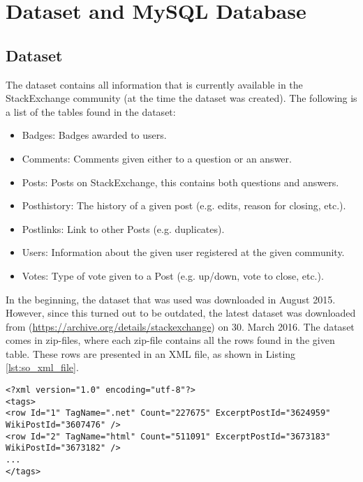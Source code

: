 \label{chap:chapter3}

\section{Dataset and MySQL Database}
\label{sec:dataset_db}

\subsection{Dataset}
The dataset contains all information that is currently available in the StackExchange community 
(at the time the dataset was created). The following is a list of the tables found in the dataset:
\begin{itemize}
	\item Badges: Badges awarded to users.
	\item Comments: Comments given either to a question or an answer.
	\item Posts: Posts on StackExchange, this contains both questions and answers.
	\item Posthistory: The history of a given post (e.g. edits, reason for closing, etc.).
	\item Postlinks: Link to other Posts (e.g. duplicates).
	\item Users: Information about the given user registered at the given community.
	\item Votes: Type of vote given to a Post (e.g. up/down, vote to close, etc.).
\end{itemize}
In the beginning, the dataset that was used was downloaded in August 2015. However, since this turned out 
to be outdated, the latest dataset was downloaded from (\url{https://archive.org/details/stackexchange}) on 
30. March 2016. The dataset comes in zip-files, where each zip-file contains all the rows found in the given 
 table. These rows are presented in an XML file, as shown in Listing \ref{lst:so_xml_file}.
\begin{lstlisting}[caption={Content in stackoverflow.com-Tags.xml}, label={lst:so_xml_file}] 
<?xml version="1.0" encoding="utf-8"?>
<tags>
<row Id="1" TagName=".net" Count="227675" ExcerptPostId="3624959" 
WikiPostId="3607476" />
<row Id="2" TagName="html" Count="511091" ExcerptPostId="3673183" 
WikiPostId="3673182" />
...
</tags>
\end{lstlisting}

